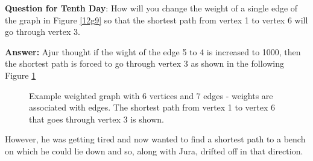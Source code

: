 \textbf{Question for Tenth Day}: How will you change the weight of a single edge of the graph in Figure \ref{12g9} so that the shortest path from vertex 1 to vertex 6 will go through vertex 3.

\textbf{Answer:} Ajur thought if the wight of the edge 5 to 4 is increased to 1000, then the shortest path is forced to go through vertex 3 as shown in the following Figure \ref{12qa1}

\begin{figure}
\begin{center}
\caption{ Example weighted graph with 6 vertices and 7 edges - weights are associated with edges. The shortest path from vertex 1 to vertex 6 that goes through vertex 3 is shown.}\label{12qa1}
\end{center}
\end{figure}

However, he was getting tired and now wanted to find a shortest path to a bench on which he could lie down and so, along with Jura, drifted off in that direction.